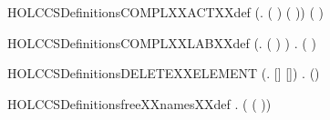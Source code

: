 \newcommand{\HOLCCSDefinitionsCCSXXSubstXXdef}{\UseVerbatim{HOLCCSDefinitionsCCSXXSubstXXdef}}
\begin{SaveVerbatim}{HOLCCSDefinitionsCOMPLXXACTXXdef}
\HOLTokenTurnstile{} (\HOLSymConst{\HOLTokenForall{}}.  ( ) \HOLSymConst{=}  ( )) \HOLSymConst{\HOLTokenConj{}} ( \HOLConst{\ensuremath{\tau}} \HOLSymConst{=} \HOLConst{\ensuremath{\tau}})
\end{SaveVerbatim}
\newcommand{\HOLCCSDefinitionsCOMPLXXACTXXdef}{\UseVerbatim{HOLCCSDefinitionsCOMPLXXACTXXdef}}
\begin{SaveVerbatim}{HOLCCSDefinitionsCOMPLXXLABXXdef}
\HOLTokenTurnstile{} (\HOLSymConst{\HOLTokenForall{}}.  ( ) \HOLSymConst{=}  ) \HOLSymConst{\HOLTokenConj{}}
   \HOLSymConst{\HOLTokenForall{}}.  ( ) \HOLSymConst{=}  
\end{SaveVerbatim}
\newcommand{\HOLCCSDefinitionsCOMPLXXLABXXdef}{\UseVerbatim{HOLCCSDefinitionsCOMPLXXLABXXdef}}
\begin{SaveVerbatim}{HOLCCSDefinitionsDELETEXXELEMENT}
\HOLTokenTurnstile{} (\HOLSymConst{\HOLTokenForall{}}.   [] \HOLSymConst{=} []) \HOLSymConst{\HOLTokenConj{}}
   \HOLSymConst{\HOLTokenForall{}}  .
         (\HOLSymConst{::}) \HOLSymConst{=}
         \HOLSymConst{=}     
        \HOLSymConst{::}  
\end{SaveVerbatim}
\newcommand{\HOLCCSDefinitionsDELETEXXELEMENT}{\UseVerbatim{HOLCCSDefinitionsDELETEXXELEMENT}}
\begin{SaveVerbatim}{HOLCCSDefinitionsfreeXXnamesXXdef}
\HOLTokenTurnstile{} \HOLSymConst{\HOLTokenForall{}}.   \HOLSymConst{=}   ( ( ))
\end{SaveVerbatim}
\newcommand{\HOLCCSDefinitionsfreeXXnamesXXdef}{\UseVerbatim{HOLCCSDefinitionsfreeXXnamesXXdef}}

